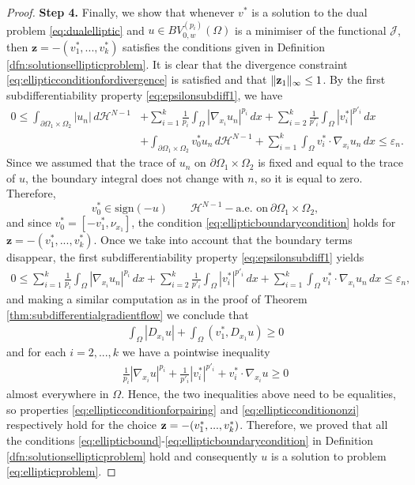 \documentclass[reqno,12pt]{amsart}
\def\z{{\bf z}}
\numberwithin{equation}{section}
\begin{document}
\begin{proof}
{\flushleft \bf Step 4.} Finally, we show that whenever $v^*$ is a solution to the dual problem \eqref{eq:dualelliptic} and $u \in BV_{0,w}^{(p_i)}(\Omega)$ is a minimiser of the functional $\mathcal{J}$, then $\mathbf{z} = -(v_1^*,...,v_k^*)$ satisfies the conditions given in Definition \ref{dfn:solutionsellipticproblem}. It is clear that the divergence constraint \eqref{eq:ellipticconditionfordivergence} is satisfied and that $\| \z_1 \|_\infty \leq 1$. By the first subdifferentiability property \eqref{eq:epsilonsubdiff1}, we have
\begin{align}
0 \leq \int_{\partial\Omega_1 \times \Omega_2} |u_n| \, d\mathcal{H}^{N-1} &+ \sum_{i=1}^k \frac{1}{p_i} \int_\Omega |\nabla_{x_i} u_n|^{p_i} \, dx + \sum_{i=2}^k \frac{1}{p'_i} \int_\Omega |v_i^*|^{p'_i} \, dx \\
&+ \int_{\partial\Omega_1 \times \Omega_2} v_0^* u_n \, d\mathcal{H}^{N-1} + \sum_{i=1}^k \int_\Omega v_i^* \cdot \nabla_{x_i} u_n \, dx  \leq \varepsilon_n.
\end{align}
Since we assumed that the trace of $u_n$ on $\partial\Omega_1 \times \Omega_2$ is fixed and equal to the trace of $u$, the boundary integral does not change with $n$, so it is equal to zero. Therefore,
\begin{equation}
v_0^* \in \mathrm{sign}(-u) \qquad  \mathcal{H}^{N-1}-\mbox{a.e.  on} \ \partial \Omega_1 \times \Omega_2,
\end{equation}
and since $v_0^* = [-v_1^*, \nu_{x_1}]$, the condition \eqref{eq:ellipticboundarycondition} holds for $\mathbf{z} = -(v_1^*,...,v_k^*)$. Once we take into account that the boundary terms disappear, the first subdifferentiability property \eqref{eq:epsilonsubdiff1} yields
\begin{align}\label{eq:beforepassingtothelimitelliptic}
0 \leq \sum_{i=1}^k \frac{1}{p_i} \int_\Omega |\nabla_{x_i} u_n|^{p_i} \, dx + \sum_{i=2}^k \frac{1}{p'_i} \int_\Omega |v_i^*|^{p'_i} \, dx + \sum_{i=1}^k \int_\Omega v_i^* \cdot \nabla_{x_i} u_n \, dx  \leq \varepsilon_n,
\end{align}
and making a similar computation as in the proof of Theorem \ref{thm:subdifferentialgradientflow} we conclude that
\begin{align}
\int_\Omega |D_{x_1} u| + \int_{\Omega} (v_1^*, D_{x_1} u) \geq 0
\end{align}
and for each $i = 2,...,k$ we have a pointwise inequality
\begin{align}
\frac{1}{p_i} |\nabla_{x_i} u|^{p_i} + \frac{1}{p'_i} |v_i^*|^{p'_i} + v_i^* \cdot \nabla_{x_i} u \geq 0
\end{align}
almost everywhere in $\Omega$. Hence, the two inequalities above need to be equalities, so properties \eqref{eq:ellipticconditionforpairing} and \eqref{eq:ellipticconditiononzi} respectively hold for the choice $\z = -(v_1^*,...,v_k^*)$. Therefore, we proved that all the conditions \eqref{eq:ellipticbound}-\eqref{eq:ellipticboundarycondition} in Definition \ref{dfn:solutionsellipticproblem} hold and consequently $u$ is a solution to problem \eqref{eq:ellipticproblem}.
\end{proof}
\end{document}
